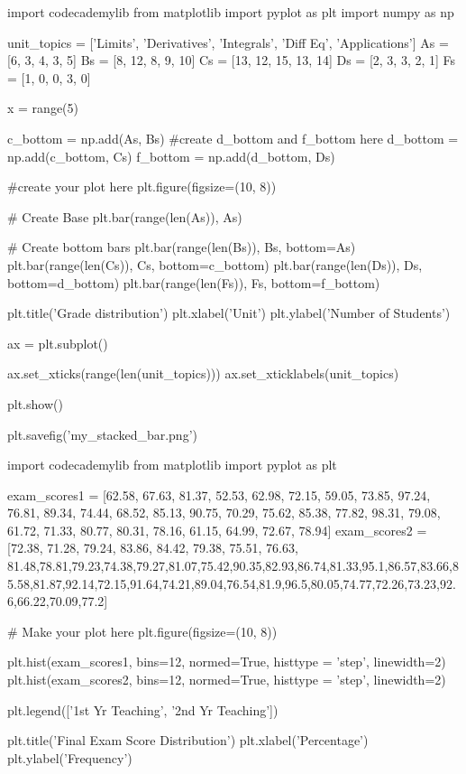 \documentclass{journal}
\begin{document}
import codecademylib
from matplotlib import pyplot as plt
import numpy as np

unit_topics = ['Limits', 'Derivatives', 'Integrals', 'Diff Eq', 'Applications']
As = [6, 3, 4, 3, 5]
Bs = [8, 12, 8, 9, 10]
Cs = [13, 12, 15, 13, 14]
Ds = [2, 3, 3, 2, 1]
Fs = [1, 0, 0, 3, 0]

x = range(5)

c_bottom = np.add(As, Bs)
#create d_bottom and f_bottom here
d_bottom = np.add(c_bottom, Cs)
f_bottom = np.add(d_bottom, Ds)

#create your plot here
plt.figure(figsize=(10, 8))

# Create Base
plt.bar(range(len(As)), As)

# Create bottom bars
plt.bar(range(len(Bs)), Bs, bottom=As)
plt.bar(range(len(Cs)), Cs, bottom=c_bottom)
plt.bar(range(len(Ds)), Ds, bottom=d_bottom)
plt.bar(range(len(Fs)), Fs, bottom=f_bottom)

plt.title('Grade distribution')
plt.xlabel('Unit')
plt.ylabel('Number of Students')

ax = plt.subplot()

ax.set_xticks(range(len(unit_topics)))
ax.set_xticklabels(unit_topics)

plt.show()

plt.savefig('my_stacked_bar.png')






import codecademylib
from matplotlib import pyplot as plt

exam_scores1 = [62.58, 67.63, 81.37, 52.53, 62.98, 72.15, 59.05, 73.85, 97.24, 76.81, 89.34, 74.44, 68.52, 85.13, 90.75, 70.29, 75.62, 85.38, 77.82, 98.31, 79.08, 61.72, 71.33, 80.77, 80.31, 78.16, 61.15, 64.99, 72.67, 78.94]
exam_scores2 = [72.38, 71.28, 79.24, 83.86, 84.42, 79.38, 75.51, 76.63, 81.48,78.81,79.23,74.38,79.27,81.07,75.42,90.35,82.93,86.74,81.33,95.1,86.57,83.66,85.58,81.87,92.14,72.15,91.64,74.21,89.04,76.54,81.9,96.5,80.05,74.77,72.26,73.23,92.6,66.22,70.09,77.2]

# Make your plot here
plt.figure(figsize=(10, 8))

plt.hist(exam_scores1, bins=12, normed=True, histtype = 'step', linewidth=2)
plt.hist(exam_scores2, bins=12, normed=True, histtype = 'step', linewidth=2)

plt.legend(['1st Yr Teaching', '2nd Yr Teaching'])

plt.title('Final Exam Score Distribution')
plt.xlabel('Percentage')
plt.ylabel('Frequency')
\end{document}

